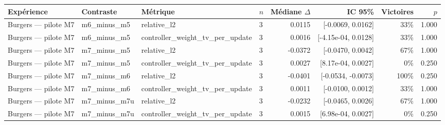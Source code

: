\begin{tabular}{llllrrrr}
\toprule
Expérience & Contraste & Métrique & $n$ & Médiane $\Delta$ & IC 95\% & Victoires & $p$ \\
\midrule
Burgers — pilote M7 & m6\_minus\_m5 & relative\_l2 & 3 & 0.0115 & [-0.0069, 0.0162] & 33\% & 1.000 \\
Burgers — pilote M7 & m6\_minus\_m5 & controller\_weight\_tv\_per\_update & 3 & 0.0016 & [-4.15e-04, 0.0128] & 33\% & 1.000 \\
Burgers — pilote M7 & m7\_minus\_m5 & relative\_l2 & 3 & -0.0372 & [-0.0470, 0.0042] & 67\% & 1.000 \\
Burgers — pilote M7 & m7\_minus\_m5 & controller\_weight\_tv\_per\_update & 3 & 0.0027 & [8.17e-04, 0.0027] & 0\% & 0.250 \\
Burgers — pilote M7 & m7\_minus\_m6 & relative\_l2 & 3 & -0.0401 & [-0.0534, -0.0073] & 100\% & 0.250 \\
Burgers — pilote M7 & m7\_minus\_m6 & controller\_weight\_tv\_per\_update & 3 & 0.0011 & [-0.0100, 0.0012] & 33\% & 1.000 \\
Burgers — pilote M7 & m7\_minus\_m7u & relative\_l2 & 3 & -0.0232 & [-0.0465, 0.0026] & 67\% & 1.000 \\
Burgers — pilote M7 & m7\_minus\_m7u & controller\_weight\_tv\_per\_update & 3 & 0.0015 & [6.98e-04, 0.0027] & 0\% & 0.250 \\
\bottomrule
\end{tabular}
